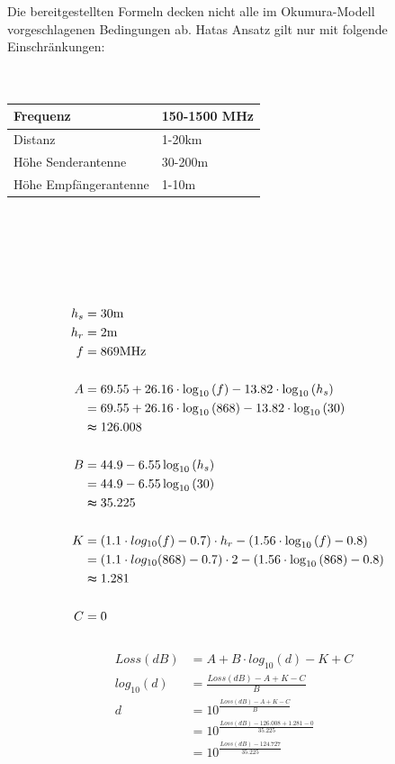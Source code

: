 \documentclass[12pt,a4paper]{article}
\begin{document}
Die bereitgestellten Formeln decken nicht alle im Okumura-Modell vorgeschlagenen Bedingungen ab. Hatas Ansatz gilt nur mit folgende Einschränkungen:\\
\\ \\
\begin{tabular}[h]{l | l}
Frequenz  & 150-1500 MHz \\
\hline
Distanz  & 1-20km\\
\hline
Höhe Senderantenne  & 30-200m\\
\hline
Höhe Empfängerantenne & 1-10m \\
\end{tabular} \\ \\ \\
\newpage
{}\\
\begin{align*}
\\
h_s &= 30\mathrm{m} \\
h_r &= 2\mathrm{m} \\
f &= 869\mathrm{MHz} \\
\\
A &= 69.55 + 26.16 \cdot \log_{10}{(f)} - 13.82 \cdot \log_{10}{(h_s)} \\
&= 69.55 + 26.16 \cdot \log_{10}{(868)} - 13.82 \cdot \log_{10}{(30)} \\
&\thickapprox 126.008 \\
\\
B &= 44.9 - 6.55 \log_{10}{(h_s)} \\
&= 44.9 - 6.55 \log_{10}{(30)}\\
&\thickapprox 35.225\\
\\
K &= (1.1 \cdot log_{10}{(f)} - 0.7) \cdot h_r - (1.56 \cdot \log_{10}{(f)} - 0.8) \\
&= (1.1 \cdot log_{10}{(868)} - 0.7) \cdot 2 - (1.56 \cdot \log_{10}{(868)} - 0.8) \\
&\thickapprox 1.281 \\
\\
C &= 0 \\
\end{align*}
\\
\begin{align*}
Loss(dB) &= A + B \cdot log_{10}{(d)} - K + C \\
log_{10}{(d)} &= \frac{Loss(dB) - A + K - C}{B} \\
d &= 10^\frac{Loss(dB) - A + K - C}{B} \\
&= 10^\frac{Loss(dB) - 126.008 + 1.281 - 0}{35.225}\\
&= 10^\frac{Loss(dB) - 124.727}{35.225}\\
\end{align*}
\newpage
\end{document}
